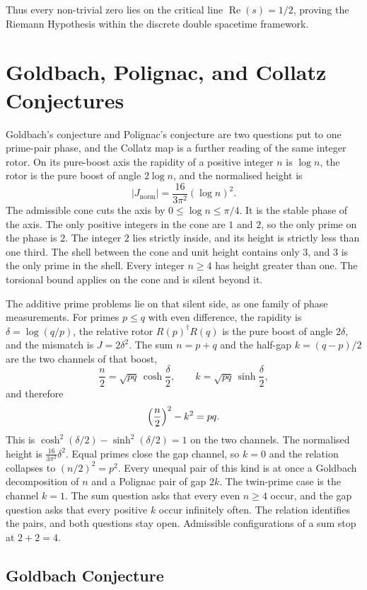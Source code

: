 \documentclass[a4paper]{article}
\theoremstyle{definition}
\theoremstyle{remark}
\newcommand{\Jnorm}{J_{\mathrm{norm}}}
\begin{document}
Thus every non-trivial zero lies on the critical line \( \operatorname{Re}(s) = 1/2 \), proving the Riemann Hypothesis within the discrete double spacetime framework.

\section{Goldbach, Polignac, and Collatz Conjectures}

Goldbach's conjecture and Polignac's conjecture are two questions put to one prime-pair phase, and the Collatz map is a further reading of the same integer rotor. On its pure-boost axis the rapidity of a positive integer \(n\) is \(\log n\), the rotor is the pure boost of angle \(2\log n\), and the normalised height is
\[
|\Jnorm|=\frac{16}{3\pi^2}(\log n)^2.
\]
The admissible cone cuts the axis by \(0\le\log n\le\pi/4\). It is the stable phase of the axis. The only positive integers in the cone are \(1\) and \(2\), so the only prime on the phase is \(2\). The integer \(2\) lies strictly inside, and its height is strictly less than one third. The shell between the cone and unit height contains only \(3\), and \(3\) is the only prime in the shell. Every integer \(n\ge 4\) has height greater than one. The torsional bound applies on the cone and is silent beyond it.

The additive prime problems lie on that silent side, as one family of phase measurements. For primes \(p\le q\) with even difference, the rapidity is \(\delta=\log(q/p)\), the relative rotor \(R(p)^\dagger R(q)\) is the pure boost of angle \(2\delta\), and the mismatch is \(J=2\delta^2\). The sum \(n=p+q\) and the half-gap \(k=(q-p)/2\) are the two channels of that boost,
\[
\frac n2=\sqrt{pq}\,\cosh\frac\delta2,\qquad k=\sqrt{pq}\,\sinh\frac\delta2,
\]
and therefore
\[
\Bigl(\frac n2\Bigr)^2-k^2=pq.
\]
This is \(\cosh^2(\delta/2)-\sinh^2(\delta/2)=1\) on the two channels. The normalised height is \(\frac{16}{3\pi^2}\delta^2\). Equal primes close the gap channel, so \(k=0\) and the relation collapses to \((n/2)^2=p^2\). Every unequal pair of this kind is at once a Goldbach decomposition of \(n\) and a Polignac pair of gap \(2k\). The twin-prime case is the channel \(k=1\). The sum question asks that every even \(n\ge 4\) occur, and the gap question asks that every positive \(k\) occur infinitely often. The relation identifies the pairs, and both questions stay open. Admissible configurations of a sum stop at \(2+2=4\).

\subsection{Goldbach Conjecture}
\end{document}

